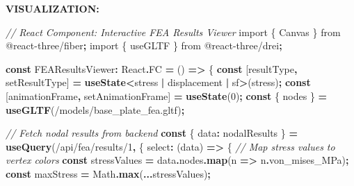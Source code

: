 \documentclass[
]{article}
\newenvironment{Shaded}{\begin{snugshade}}{\end{snugshade}}
\newcommand{\AttributeTok}[1]{\textcolor[rgb]{0.13,0.29,0.53}{#1}}
\newcommand{\BuiltInTok}[1]{#1}
\newcommand{\CommentTok}[1]{\textcolor[rgb]{0.56,0.35,0.01}{\textit{#1}}}
\newcommand{\DecValTok}[1]{\textcolor[rgb]{0.00,0.00,0.81}{#1}}
\newcommand{\FunctionTok}[1]{\textcolor[rgb]{0.13,0.29,0.53}{\textbf{#1}}}
\newcommand{\ImportTok}[1]{#1}
\newcommand{\KeywordTok}[1]{\textcolor[rgb]{0.13,0.29,0.53}{\textbf{#1}}}
\newcommand{\NormalTok}[1]{#1}
\newcommand{\OperatorTok}[1]{\textcolor[rgb]{0.81,0.36,0.00}{\textbf{#1}}}
\newcommand{\StringTok}[1]{\textcolor[rgb]{0.31,0.60,0.02}{#1}}
\begin{document}
\textbf{VISUALIZATION:}

\begin{Shaded}
\begin{Highlighting}[]
\CommentTok{// React Component: Interactive FEA Results Viewer}
\ImportTok{import}\NormalTok{ \{ Canvas \} }\ImportTok{from} \StringTok{\textquotesingle{}@react{-}three/fiber\textquotesingle{}}\OperatorTok{;}
\ImportTok{import}\NormalTok{ \{ useGLTF \} }\ImportTok{from} \StringTok{\textquotesingle{}@react{-}three/drei\textquotesingle{}}\OperatorTok{;}

\KeywordTok{const}\NormalTok{ FEAResultsViewer}\OperatorTok{:}\NormalTok{ React}\OperatorTok{.}\AttributeTok{FC} \OperatorTok{=}\NormalTok{ () }\KeywordTok{=\textgreater{}}\NormalTok{ \{}
  \KeywordTok{const}\NormalTok{ [resultType}\OperatorTok{,}\NormalTok{ setResultType] }\OperatorTok{=} \FunctionTok{useState}\OperatorTok{\textless{}}\StringTok{\textquotesingle{}stress\textquotesingle{}} \OperatorTok{|} \StringTok{\textquotesingle{}displacement\textquotesingle{}} \OperatorTok{|} \StringTok{\textquotesingle{}sf\textquotesingle{}}\OperatorTok{\textgreater{}}\NormalTok{(}\StringTok{\textquotesingle{}stress\textquotesingle{}}\NormalTok{)}\OperatorTok{;}
  \KeywordTok{const}\NormalTok{ [animationFrame}\OperatorTok{,}\NormalTok{ setAnimationFrame] }\OperatorTok{=} \FunctionTok{useState}\NormalTok{(}\DecValTok{0}\NormalTok{)}\OperatorTok{;}
  \KeywordTok{const}\NormalTok{ \{ nodes \} }\OperatorTok{=} \FunctionTok{useGLTF}\NormalTok{(}\StringTok{\textquotesingle{}/models/base\_plate\_fea.gltf\textquotesingle{}}\NormalTok{)}\OperatorTok{;}

  \CommentTok{// Fetch nodal results from backend}
  \KeywordTok{const}\NormalTok{ \{ data}\OperatorTok{:}\NormalTok{ nodalResults \} }\OperatorTok{=} \FunctionTok{useQuery}\NormalTok{(}\StringTok{\textquotesingle{}/api/fea/results/1\textquotesingle{}}\OperatorTok{,}\NormalTok{ \{}
\NormalTok{    select}\OperatorTok{:}\NormalTok{ (data) }\KeywordTok{=\textgreater{}}\NormalTok{ \{}
      \CommentTok{// Map stress values to vertex colors}
      \KeywordTok{const}\NormalTok{ stressValues }\OperatorTok{=}\NormalTok{ data}\OperatorTok{.}\AttributeTok{nodes}\OperatorTok{.}\FunctionTok{map}\NormalTok{(n }\KeywordTok{=\textgreater{}}\NormalTok{ n}\OperatorTok{.}\AttributeTok{von\_mises\_MPa}\NormalTok{)}\OperatorTok{;}
      \KeywordTok{const}\NormalTok{ maxStress }\OperatorTok{=} \BuiltInTok{Math}\OperatorTok{.}\FunctionTok{max}\NormalTok{(}\OperatorTok{...}\NormalTok{stressValues)}\OperatorTok{;}


\end{Highlighting}
\end{Shaded}
\end{document}
